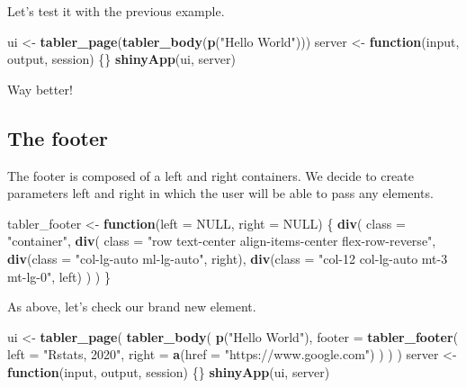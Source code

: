\documentclass[]{book}
\newenvironment{Shaded}{\begin{snugshade}}{\end{snugshade}}
\newcommand{\ControlFlowTok}[1]{\textcolor[rgb]{0.13,0.29,0.53}{\textbf{#1}}}
\newcommand{\DataTypeTok}[1]{\textcolor[rgb]{0.13,0.29,0.53}{#1}}
\newcommand{\KeywordTok}[1]{\textcolor[rgb]{0.13,0.29,0.53}{\textbf{#1}}}
\newcommand{\NormalTok}[1]{#1}
\newcommand{\OtherTok}[1]{\textcolor[rgb]{0.56,0.35,0.01}{#1}}
\newcommand{\StringTok}[1]{\textcolor[rgb]{0.31,0.60,0.02}{#1}}
\begin{document}
Let's test it with the previous example.

\begin{Shaded}
\begin{Highlighting}[]
\NormalTok{ui <-}\StringTok{ }\KeywordTok{tabler_page}\NormalTok{(}\KeywordTok{tabler_body}\NormalTok{(}\KeywordTok{p}\NormalTok{(}\StringTok{"Hello World"}\NormalTok{)))}
\NormalTok{server <-}\StringTok{ }\ControlFlowTok{function}\NormalTok{(input, output, session) \{\}}
\KeywordTok{shinyApp}\NormalTok{(ui, server)}
\end{Highlighting}
\end{Shaded}

Way better!

\hypertarget{the-footer}{%
\subsection{The footer}\label{the-footer}}

The footer is composed of a left and right containers. We decide to create parameters left and right in which the user will be able to pass any elements.

\begin{Shaded}
\begin{Highlighting}[]
\NormalTok{tabler_footer <-}\StringTok{ }\ControlFlowTok{function}\NormalTok{(}\DataTypeTok{left =} \OtherTok{NULL}\NormalTok{, }\DataTypeTok{right =} \OtherTok{NULL}\NormalTok{) \{}
  \KeywordTok{div}\NormalTok{(}
    \DataTypeTok{class =} \StringTok{"container"}\NormalTok{,}
    \KeywordTok{div}\NormalTok{(}
      \DataTypeTok{class =} \StringTok{"row text-center align-items-center flex-row-reverse"}\NormalTok{,}
      \KeywordTok{div}\NormalTok{(}\DataTypeTok{class =} \StringTok{"col-lg-auto ml-lg-auto"}\NormalTok{, right),}
      \KeywordTok{div}\NormalTok{(}\DataTypeTok{class =} \StringTok{"col-12 col-lg-auto mt-3 mt-lg-0"}\NormalTok{, left)}
\NormalTok{    )}
\NormalTok{  )}
\NormalTok{\}}
\end{Highlighting}
\end{Shaded}

As above, let's check our brand new element.

\begin{Shaded}
\begin{Highlighting}[]
\NormalTok{ui <-}\StringTok{ }\KeywordTok{tabler_page}\NormalTok{(}
  \KeywordTok{tabler_body}\NormalTok{(}
    \KeywordTok{p}\NormalTok{(}\StringTok{"Hello World"}\NormalTok{),}
    \DataTypeTok{footer =} \KeywordTok{tabler_footer}\NormalTok{(}
      \DataTypeTok{left =} \StringTok{"Rstats, 2020"}\NormalTok{, }
      \DataTypeTok{right =} \KeywordTok{a}\NormalTok{(}\DataTypeTok{href =} \StringTok{"https://www.google.com"}\NormalTok{)}
\NormalTok{    )}
\NormalTok{  )}
\NormalTok{)}
\NormalTok{server <-}\StringTok{ }\ControlFlowTok{function}\NormalTok{(input, output, session) \{\}}
\KeywordTok{shinyApp}\NormalTok{(ui, server)}
\end{Highlighting}
\end{Shaded}
\end{document}
